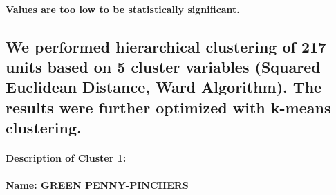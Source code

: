 \documentclass[
]{article}
\begin{document}
\hypertarget{values-are-too-low-to-be-statistically-significant.-1}{%
\paragraph{Values are too low to be statistically
significant.}\label{values-are-too-low-to-be-statistically-significant.-1}}

\hypertarget{we-performed-hierarchical-clustering-of-217-units-based-on-5-cluster-variables-squared-euclidean-distance-ward-algorithm.-the-results-were-further-optimized-with-k-means-clustering.}{%
\subsection{We performed hierarchical clustering of 217 units based on 5
cluster variables (Squared Euclidean Distance, Ward Algorithm). The
results were further optimized with k-means
clustering.}\label{we-performed-hierarchical-clustering-of-217-units-based-on-5-cluster-variables-squared-euclidean-distance-ward-algorithm.-the-results-were-further-optimized-with-k-means-clustering.}}

\hypertarget{description-of-cluster-1}{%
\paragraph{Description of Cluster 1:}\label{description-of-cluster-1}}

\hypertarget{name-green-penny-pinchers}{%
\paragraph{Name: GREEN PENNY-PINCHERS}\label{name-green-penny-pinchers}}
\end{document}
